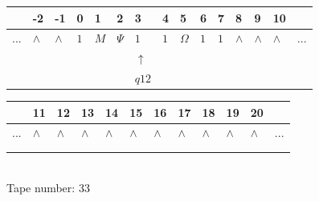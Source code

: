 \documentclass[11pt]{article}
\begin{document}
\begin{table}[H]
\centering
\begin{tabular}{lllllllllllllll}
 & -2 & -1 & 0 & 1 & 2 & 3 & 4 & 5 & 6 & 7 & 8 & 9 & 10 & \\
\hline
$...$ & \multicolumn{1}{|l|}{$\wedge$} & \multicolumn{1}{|l|}{$\wedge$} & \multicolumn{1}{|l|}{$1$} & \multicolumn{1}{|l|}{$M$} & \multicolumn{1}{|l|}{$\Psi$} & \multicolumn{1}{|l|}{$1$} & \multicolumn{1}{|l|}{$1$} & \multicolumn{1}{|l|}{$\Omega$} & \multicolumn{1}{|l|}{$1$} & \multicolumn{1}{|l|}{$1$} & \multicolumn{1}{|l|}{$\wedge$} & \multicolumn{1}{|l|}{$\wedge$} & \multicolumn{1}{|l|}{$\wedge$} & $...$\\
\hline
&  &  &  &  &  & $\uparrow$ &  &  &  &  &  &  &  &  \\
&  &  &  &  &  & $ q12 $ &  &  &  &  &  &  &  &  \\
\end{tabular}
\begin{tabular}{llllllllllll}
 & 11 & 12 & 13 & 14 & 15 & 16 & 17 & 18 & 19 & 20 & \\
\hline
$...$ & \multicolumn{1}{|l|}{$\wedge$} & \multicolumn{1}{|l|}{$\wedge$} & \multicolumn{1}{|l|}{$\wedge$} & \multicolumn{1}{|l|}{$\wedge$} & \multicolumn{1}{|l|}{$\wedge$} & \multicolumn{1}{|l|}{$\wedge$} & \multicolumn{1}{|l|}{$\wedge$} & \multicolumn{1}{|l|}{$\wedge$} & \multicolumn{1}{|l|}{$\wedge$} & \multicolumn{1}{|l|}{$\wedge$} & $...$\\
\hline
&  &  &  &  &  &  &  &  &  &  &  \\
&  &  &  &  &  &  &  &  &  &  &  \\
\end{tabular}
\\
Tape number: 33
\noindent\makebox[\linewidth]{\hdashrule{\textwidth}{1pt}{1pt}}\end{table}
\end{document}
